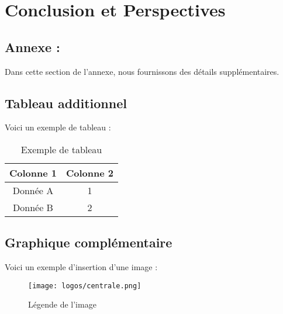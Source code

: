 \documentclass{rapportECC}
\begin{document}




\section{Conclusion et Perspectives}


\newpage


\printbibliography

\newpage
\begin{appendices}
\section{Annexe : }
Dans cette section de l'annexe, nous fournissons des détails supplémentaires.

\subsection{Tableau additionnel}
Voici un exemple de tableau :
\begin{table}[h]
    \centering
    \begin{tabular}{|c|c|}
    \hline
    Colonne 1 & Colonne 2 \\
    \hline
    Donnée A & 1 \\
    Donnée B & 2 \\
    \hline
    \end{tabular}
    \caption{Exemple de tableau}
\end{table}

\subsection{Graphique complémentaire}
Voici un exemple d'insertion d'une image :
\begin{figure}[h]
    \centering
    \texttt{[image: logos/centrale.png]}
    \caption{Légende de l'image}
\end{figure}
\end{appendices}
\end{document}
